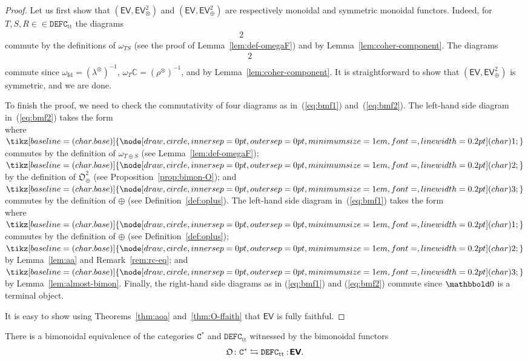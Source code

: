 \documentclass[10pt]{simplearticle}
\newcommand{\tikzinput}[1]{}
\newcommand{\tcbase}[1]{%
  \mathord{%
    \tikz[baseline=(char.base)]{
      \node[draw,circle,inner sep=0pt,outer sep=0pt,minimum size=1em,font=\small,line width=0.2pt] (char) {#1};
    }%
  }%
}
\newcommand{\Id}{\operatorname{Id}}
\newcommand{\DEFC}{\mathbb{\mathtt{DEFC}}}
\newcommand{\Cstar}{\mathtt{C^{*}}}
\newcommand{\mathsb}[1]{\boldsymbol{\mathsf{#1}}}
\newcommand{\tc}[1]{\tcbase{#1}}
\newcommand{\bbzero}{\mathbbold0}
\newcommand{\EV}{\mathsb{EV}}
\newcommand{\ttt}{\operatorname{tt}}
\newcommand{\noloc}{\nobreak
\mspace{4mu plus 1mu}
{:}
\nonscript\mkern-\thinmuskip
\mathpunct{}
\mspace{2mu}
}
\begin{document}
\begin{proof}
Let us first show that $(\EV,\EV^{2}_{\otimes})$ and $(\EV,\EV^{2}_{\oplus})$
are respectively monoidal and symmetric monoidal functors. Indeed,
for $T,S,R\in\in\DEFC_{\ttt}$ the diagrams
\begin{alignat*}{2}
\tikzinput{d392} & \qquad\qquad & \tikzinput{d411}
\end{alignat*}
commute by the definitions of $\omega_{TS}$ (see the proof of Lemma~\ref{lem:def-omegaF})
and by Lemma~\ref{lem:coher-component}. The diagrams
\begin{alignat*}{2}
\tikzinput{d394} & \qquad & \tikzinput{d395}\\
\tikzinput{d413} &\ 
& \tikzinput{d412}
\end{alignat*}
commute since $\omega_{\Id}=(\lambda^{\otimes})^{-1}$, $\omega_{T}\mathbb{C}=(\rho^{\otimes})^{-1}$,
and by Lemma~\ref{lem:coher-component}. It is straightforward to
show that $(\EV,\EV^{2}_{\oplus})$ is symmetric, and we are done.

To finish the proof, we need to check the commutativity of four diagrams
as in~(\ref{eq:bmf1}) and~(\ref{eq:bmf2}). The left-hand side
diagram in~(\ref{eq:bmf2}) takes the form
\[
\tikzinput{d486}
\]
where $\tc 1$ commutes by the definition of $\omega_{T\oplus S}$
(see Lemma~\ref{lem:def-omegaF}); $\tc 2$ by the definition of
$\mathfrak{O}^{2}_{\oplus}$ (see Proposition~\ref{prop:bimon-O});
and $\tc 3$ commutes by the definition of $\oplus$ (see Definition~\ref{def:oplus}).
The left-hand side diagram in~(\ref{eq:bmf1}) takes the form
\[
\tikzinput{d414}
\]
where $\tc 1$ commutes by the definition of $\oplus$ (see Definition~\ref{def:oplus});
$\tc 2$ by Lemma~\ref{lem:aa} and Remark~\ref{rem:rc-eq}; and
$\tc 3$ by Lemma~\ref{lem:almost-bimon}. Finally, the right-hand
side diagrams as in (\ref{eq:bmf1}) and (\ref{eq:bmf2}) commute
since $\bbzero$ is a terminal object.

It is easy to show using Theorems~\ref{thm:aoa} and~\ref{thm:O-ffaith}
that $\EV$ is fully faithful.
\end{proof}

\begin{thm}\label{thm:strictif-defc}
There
is a bimonoidal
equivalence of the categories $\Cstar$ and $\DEFC_{\ttt}$ witnessed
by the bimonoidal functors
\[
\mathfrak{O}\colon\Cstar\leftrightarrows\DEFC_{\ttt}\noloc\EV.
\]
\end{thm}
\end{document}
